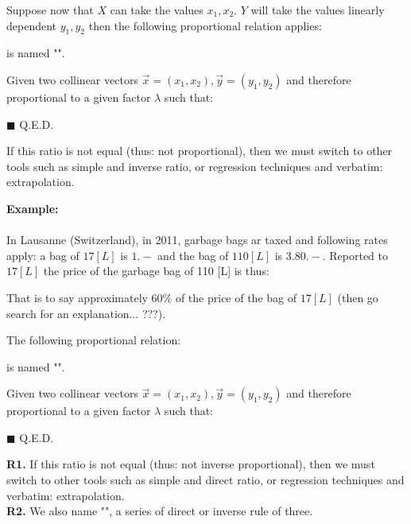 \begin{theorem}
Suppose now that $X$ can take the values $x_1,x_2$. $Y$ will take  the values linearly dependent $y_1,y_2$ then the following proportional relation applies:
	
is named "".
\end{theorem}
\begin{dem}
	Given two collinear vectors $\vec{x}=(x_1,x_2),\vec{y}=(y_1,y_2)$ and therefore proportional to a given factor $\lambda$ such that:
	
	\begin{flushright}
		$\blacksquare$  Q.E.D.
	\end{flushright}
\end{dem}
	\begin{tcolorbox}[title=Remarks,colframe=black,arc=10pt]
If this ratio is not equal (thus: not proportional), then we must switch to other tools such as simple and inverse ratio, or regression techniques and verbatim: extrapolation.
	\end{tcolorbox}	
	\begin{tcolorbox}[colframe=black,colback=white,sharp corners]
\textbf{{\Large {}}Example:}\\\\
In Lausanne (Switzerland), in 2011, garbage bags ar taxed and following rates apply: a bag of $17 [L]$ is $1.-$ and the bag of $110 [L]$ is $3.80.-$. Reported to $17 [L]$ the price of the garbage bag of 110 [L] is thus:
	
That is to say approximately $60\%$ of the price of the bag of $17 [L]$ (then go search for an explanation... ???).
	\end{tcolorbox}
\begin{theorem}
The following proportional relation:
	
is named "".
\end{theorem}
\begin{dem}
	Given two collinear vectors $\vec{x}=(x_1,x_2),\vec{y}=(y_1,y_2)$ and therefore proportional to a given factor $\lambda$ such that:
	
	\begin{flushright}
		$\blacksquare$  Q.E.D.
	\end{flushright}
\end{dem}
	\begin{tcolorbox}[title=Remark,colframe=black,arc=10pt]
\textbf{R1. }If this ratio is not equal (thus: not inverse proportional), then we must switch to other tools such as simple and direct ratio, or regression techniques and verbatim: extrapolation.\\
\textbf{R2.} We also name "", a series of direct or inverse rule of three.
	\end{tcolorbox}	

